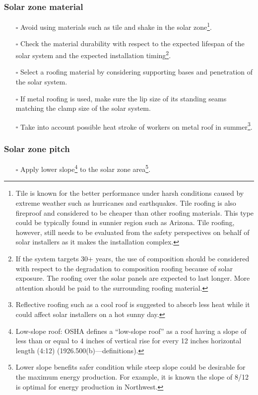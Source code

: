 \documentclass[]{article}
\providecommand{\tightlist}{%
  \setlength{\itemsep}{0pt}\setlength{\parskip}{0pt}}
\let\rmarkdownfootnote\footnote%
\def\footnote{\protect\rmarkdownfootnote}
\begin{document}
\hypertarget{solar-zone-material}{%
\subsubsection{Solar zone material}\label{solar-zone-material}}

\begin{itemize}
\tightlist
\item[$\square$]
  Avoid using materials such as tile and shake in the solar
  zone\footnote{Tile is known for the better performance under harsh
    conditions caused by extreme weather such as hurricanes and
    earthquakes. Tile roofing is also fireproof and considered to be
    cheaper than other roofing materials. This type could be typically
    found in sunnier region such as Arizona. Tile roofing, however,
    still needs to be evaluated from the safety perspectives on behalf
    of solar installers as it makes the installation complex.}.
\item[$\square$]
  Check the material durability with respect to the expected lifespan of
  the solar system and the expected installation timing\footnote{If the
    system targets 30+ years, the use of composition should be
    considered with respect to the degradation to composition roofing
    because of solar exposure. The roofing over the solar panels are
    expected to last longer. More attention should be paid to the
    surrounding roofing material.}.
\item[$\square$]
  Select a roofing material by considering supporting bases and
  penetration of the solar system.
\item[$\square$]
  If metal roofing is used, make sure the lip size of its standing seams
  matching the clamp size of the solar system.
\item[$\square$]
  Take into account possible heat stroke of workers on metal roof in
  summer\footnote{Reflective roofing such as a cool roof is suggested to
    absorb less heat while it could affect solar installers on a hot
    sunny day.}.
\end{itemize}

\hypertarget{solar-zone-pitch}{%
\subsubsection{Solar zone pitch}\label{solar-zone-pitch}}

\begin{itemize}
\tightlist
\item[$\square$]
  Apply lower slope\footnote{Low-slope roof: OSHA defines a ``low-slope
    roof'' as a roof having a slope of less than or equal to 4 inches of
    vertical rise for every 12 inches horizontal length (4:12)
    (1926.500(b)---definitions).} to the solar zone area\footnote{Lower
    slope benefits safer condition while steep slope could be desirable
    for the maximum energy production. For example, it is known the
    slope of 8/12 is optimal for energy production in Northwest.}.
\end{itemize}
\end{document}
